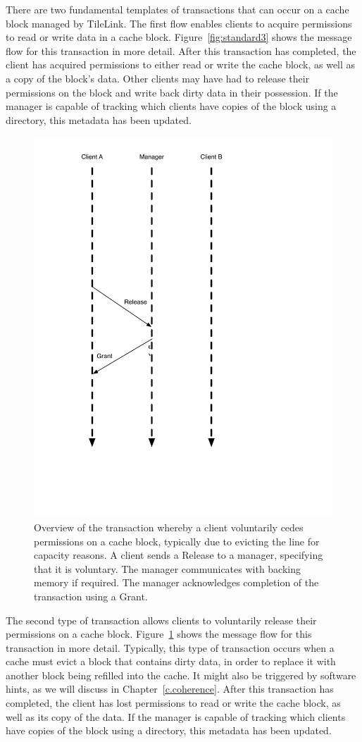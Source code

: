 There are two fundamental templates of transactions that can occur on a cache block managed by TileLink.
The first flow enables clients to acquire permissions to read or write data in a cache block.
Figure~\ref{fig:standard3} shows the message flow for this transaction in more detail.
After this transaction has completed, the client has acquired permissions to either read or write the cache block, as well as a copy of the block's data.
Other clients may have had to release their permissions on the block and write back dirty data in their possession.
If the manager is capable of tracking which clients have copies of the block using a directory, this metadata has been updated.

\begin{figure}[t!]
\centering
\includegraphics[width=0.5\columnwidth]{tilelink/figures/volwb.pdf}
\caption{Overview of the transaction whereby a client voluntarily cedes permissions on a cache block,
typically due to evicting the line for capacity reasons.
A client sends a Release to a manager, specifying that it is voluntary.
The manager communicates with backing memory if required.
The manager acknowledges completion of the transaction using a Grant.
}
\label{fig:volwb}
\end{figure}

The second type of transaction allows clients to voluntarily release their permissions on a cache block.
Figure~\ref{fig:volwb} shows the message flow for this transaction in more detail.
Typically, this type of transaction occurs when a cache must evict a block that contains dirty data, in order to replace it
with another block being refilled into the cache.
It might also be triggered by software hints, as we will discuss in Chapter~\ref{c.coherence}.
After this transaction has completed, the client has lost permissions to read or write the cache block, as well as its copy of the data.
If the manager is capable of tracking which clients have copies of the block using a directory, this metadata has been updated.

